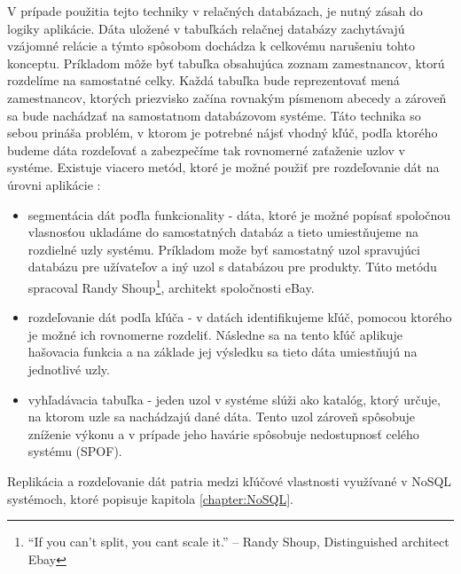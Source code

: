 \documentclass[11pt,twoside,a4paper]{book}
\begin{document}
V prípade použitia tejto techniky v relačných databázach, je nutný zásah do logiky aplikácie. Dáta uložené v tabuľkách relačnej databázy zachytávajú vzájomné relácie a týmto spôsobom dochádza k celkovému narušeniu tohto konceptu. Príkladom môže byť tabuľka obsahujúca zoznam zamestnancov, ktorú rozdelíme na samostatné celky. Každá tabuľka bude reprezentovať mená zamestnancov, ktorých priezvisko začína rovnakým písmenom abecedy a zároveň sa bude nachádzať na samostatnom databázovom systéme. Táto technika so sebou prináša problém, v ktorom je potrebné nájsť vhodný kľúč, podľa ktorého budeme dáta rozdeľovať a zabezpečíme tak rovnomerné zaťaženie uzlov v systéme. Existuje viacero metód, ktoré je možné použiť pre rozdeľovanie dát na úrovni aplikácie \cite{hewitt2010cassandra}:
\begin{itemize}
 \item 
      segmentácia dát poďla funkcionality - dáta, ktoré je možné popísať spoločnou vlasnosťou ukladáme do samostatných databáz a tieto umiestňujeme na rozdielné uzly systému. Príkladom može byť samostatný uzol spravujúci databázu pre užívateľov a iný uzol s databázou pre produkty. Túto metódu spracoval Randy Shoup\footnote{“If you can’t split, you cant scale it.” -- Randy Shoup, Distinguished architect Ebay}\cite{ebayShard}, architekt spoločnosti eBay.
  \item
      rozdeľovanie dát podľa kľúča - v datách identifikujeme kľúč, pomocou ktorého je možné ich rovnomerne rozdeliť. Následne sa na tento kľúč aplikuje hašovacia funkcia a na základe jej výsledku sa tieto dáta umiestňujú na jednotlivé uzly.
  \item
      vyhľadávacia tabuľka - jeden uzol v systéme slúži ako katalóg, ktorý určuje, na ktorom uzle sa nachádzajú dané dáta. Tento uzol zároveň spôsobuje zníženie výkonu a v prípade jeho havárie spôsobuje nedostupnosť celého systému (SPOF).
\end{itemize}

Replikácia a rozdeľovanie dát patria medzi kľúčové vlastnosti využívané v NoSQL systémoch, ktoré popisuje kapitola \ref{chapter:NoSQL}.


\end{document}
